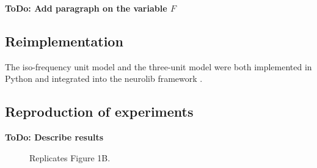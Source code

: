 \textbf{ToDo: Add paragraph on the variable $F$} 


\subsection{Reimplementation}
The iso-frequency unit model and the three-unit model were both implemented in Python and integrated into the neurolib framework 
\supercite{cakan2019neurolib}.


\subsection{Reproduction of experiments}

\textbf{ToDo: Describe results}



\begin{figure}
 \caption{Replicates Figure 1B.}
\end{figure}


